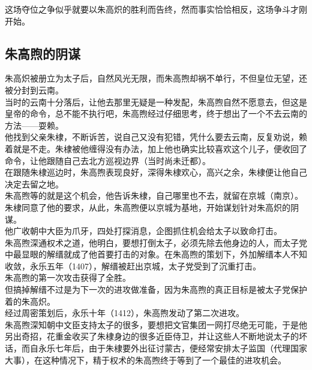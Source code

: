 \begin{multicols}{\theparacolNo}
这场夺位之争似乎就要以朱高炽的胜利而告终，然而事实恰恰相反，这场争斗才刚开始。\\

\subsection{朱高煦的阴谋}
朱高炽被册立为太子后，自然风光无限，而朱高煦却祸不单行，不但皇位无望，还被分封到云南。\\

当时的云南十分落后，让他去那里无疑是一种发配，朱高煦自然不愿意去，但这是皇帝的命令，总不能不执行吧，朱高煦经过仔细思考，终于想出了一个不去云南的方法——耍赖。\\

他找到父亲朱棣，不断诉苦，说自己又没有犯错，凭什么要去云南，反复劝说，赖着就是不走。朱棣被他缠得没有办法，加上他也确实比较喜欢这个儿子，便收回了命令，让他跟随自己去北方巡视边界（当时尚未迁都）。\\

在跟随朱棣巡边时，朱高煦表现良好，深得朱棣欢心，高兴之余，朱棣便让他自己决定去留之地。\\

朱高煦等的就是这个机会，他告诉朱棣，自己哪里也不去，就留在京城（南京）。\\

朱棣同意了他的要求，从此，朱高煦便以京城为基地，开始谋划针对朱高炽的阴谋。\\

他广收朝中大臣为爪牙，四处打探消息，企图抓住机会给太子以致命打击。\\

朱高煦深通权术之道，他明白，要想打倒太子，必须先除去他身边的人，而太子党中最显眼的解缙就成了他首要打击的对象。在朱高煦的策划下，外加解缙本人不知收敛，永乐五年（1407），解缙被赶出京城，太子党受到了沉重打击。\\

朱高煦的第一次攻击获得了全胜。\\

但搞掉解缙不过是为下一次的进攻做准备，因为朱高煦的真正目标是被太子党保护着的朱高炽。\\

经过周密策划后，永乐十年（1412），朱高煦发动了第二次进攻。\\

朱高煦深知朝中文臣支持太子的很多，要想把文官集团一网打尽绝无可能，于是他另出奇招，花重金收买了朱棣身边的很多近臣侍卫，并让这些人不断地说太子的坏话，而自永乐七年后，由于朱棣要外出征讨蒙古，便经常安排太子监国（代理国家大事），在这种情况下，精于权术的朱高煦终于等到了一个最佳的进攻机会。\\


\end{multicols}
